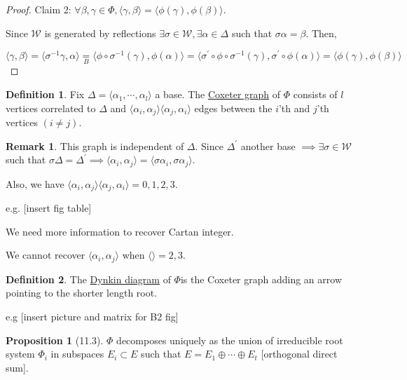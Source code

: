 \documentclass{article}
\theoremstyle{definition}
\newtheorem*{definition}{Definition}
\newtheorem{proposition}[theorem]{Proposition}
\newtheorem*{remark}{Remark}
\begin{document}
\begin{proof}
    Claim 2: \(\forall \beta , \gamma \in \Phi , \langle \gamma , \beta \rangle = \langle \phi(\gamma), \phi(\beta) \rangle \).

    Since \(\mathcal{W}\) is generated by reflections \(\exists \sigma \in \mathcal{W} , \exists \alpha \in \Delta\) such that \(\sigma \alpha =\beta\). Then,

    \[
        \langle \gamma , \beta \rangle = \langle \sigma ^{-1} \gamma , \alpha \rangle \underset{B}{=} \langle \phi \circ \sigma ^{-1} (\gamma), \phi(\alpha) \rangle = \langle \sigma ^{\prime} \circ \phi \circ \sigma ^{-1} (\gamma), \sigma^{\prime} \circ \phi(\alpha) \rangle = \langle \phi(\gamma), \phi(\beta) \rangle  
    \]
\end{proof}

\begin{definition}
    Fix \(\Delta = \langle \alpha_1, \cdots , \alpha_l \rangle \) a base. The \underline{Coxeter graph} of \(\Phi\) consists of \(l\) vertices correlated to \(\Delta\) and \(\langle \alpha_i, \alpha_j \rangle \langle \alpha_j, \alpha_i \rangle \) edges between the \(i\)'th and \(j\)'th vertices \((i\neq j)\).
\end{definition}

\begin{remark}
    This graph is independent of \(\Delta\). Since \(\Delta ^{\prime}\) another base \(\implies \exists \sigma \in \mathcal{W}\) such that \(\sigma \Delta = \Delta ^{\prime}  \implies \langle \alpha_i, \alpha _j \rangle = \langle \sigma \alpha_i, \sigma \alpha_j \rangle\).

    Also, we have \(\langle \alpha_i, \alpha_j \rangle \langle \alpha_j, \alpha_i \rangle = 0,1,2,3\).

\end{remark}

e.g. [insert fig table]

We need more information to recover Cartan integer.

We cannot recover \(\langle \alpha_i, \alpha_j \rangle\) when \(\langle  \rangle = 2,3\).

\begin{definition}
    The \underline{Dynkin diagram} of \(\Phi\)is the Coxeter graph adding an arrow pointing to the shorter length root.

    e.g [insert picture and matrix for B2 fig]
\end{definition}

\begin{proposition}
    [11.3] \(\Phi\) decomposes uniquely as the union of irreducible root system \(\Phi_i\) in subspaces \(E_i \subset E\) such that \(E = E_1 \oplus \cdots \oplus E_t\) [orthogonal direct sum].
\end{proposition}
\end{document}
